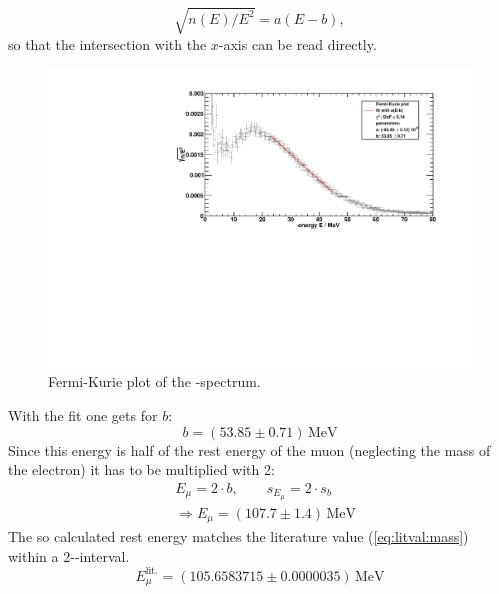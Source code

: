 \begin{equation}
    \sqrt{n(E)/E^2} = a(E-b),
\end{equation}
so that the intersection with the $x$-axis can be read directly.
\begin{figure}[H]
\begin{center}
  \includegraphics[width=\textwidth]{../img/betaspectrum_FermiKurie_fit.pdf}
  \caption{Fermi-Kurie plot of the \textbeta-spectrum.}
  \label{img:beta:fermikuriefit}
\end{center}
\end{figure}
With the fit one gets for $b$:
\begin{equation}
    b = (53.85 \pm 0.71)\,\text{MeV}
\end{equation}
Since this energy is half of the rest energy of the muon (neglecting the mass of the electron) it has to be multiplied with 2:
\begin{equation}
\begin{split}
	\label{eq:result:mass}
    & E_\mu = 2 \cdot b, \qquad s_{E_\mu} = 2 \cdot s_b \\
    & \Rightarrow E_\mu = (107.7 \pm 1.4)\,\text{MeV}
    \end{split}
\end{equation}
The so calculated rest energy matches the literature value (\autoref{eq:litval:mass}) within a 2-\textsigma-interval.
\begin{equation}
    E_\mu^{\text{lit.}} = (105.6583715 \pm 0.0000035)\,\text{MeV}
\end{equation}

\newpage

